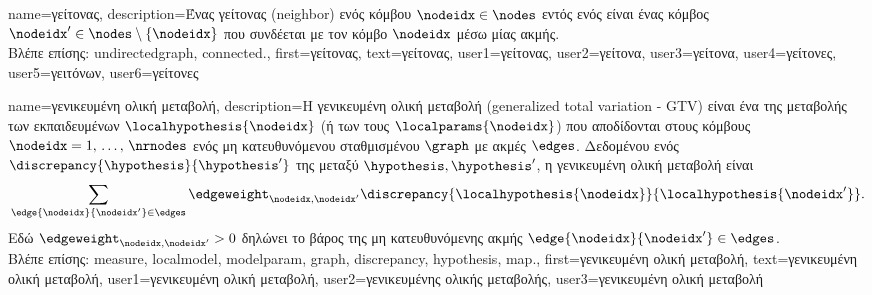 {name={\foreignlanguage{greek}{γείτονας}},
	description={\foreignlanguage{greek}{Ένας γείτονας} (neighbor) \foreignlanguage{greek}{ενός 
		κόμβου} 
		$\nodeidx \in \nodes$ \foreignlanguage{greek}{εντός ενός}  
		\foreignlanguage{greek}{είναι ένας κόμβος $\nodeidx' \in \nodes \setminus \{ \nodeidx\}$ 
		που συνδέεται με τον κόμβο $\nodeidx$ μέσω μίας ακμής}.
		\\
		\foreignlanguage{greek}{Βλέπε επίσης:} \gls{undirectedgraph}, \gls{connected}.},
	first={\foreignlanguage{greek}{γεί\-τονας}},
	text={\foreignlanguage{greek}{γεί\-τονας}},
	user1={\foreignlanguage{greek}{γείτονας}}, %
   	user2={\foreignlanguage{greek}{γείτονα}}, %
	user3={\foreignlanguage{greek}{γείτονα}}, %
	user4={\foreignlanguage{greek}{γείτονες}}, %
   	user5={\foreignlanguage{greek}{γειτόνων}}, %
	user6={\foreignlanguage{greek}{γείτονες}} %
}

{name={\foreignlanguage{greek}{γενικευμένη ολική μεταβολή}}, 
	description={\foreignlanguage{greek}{Η γενικευμένη ολική μεταβολή} (generalized total variation - GTV) \foreignlanguage{greek}{είναι 
		ένα}  \foreignlanguage{greek}{της μεταβολής των 
		εκπαιδευμένων} 
		 $\localhypothesis{\nodeidx}$ (\foreignlanguage{greek}{ή των}  
		\foreignlanguage{greek}{τους} $\localparams{\nodeidx}$) \foreignlanguage{greek}{που αποδίδονται στους κόμβους 
		$\nodeidx=1, \,\ldots, \,\nrnodes$ ενός μη κατευθυνόμενου σταθμισμένου}  $\graph$ 
		\foreignlanguage{greek}{με ακμές $\edges$. Δεδομένου ενός}  $\discrepancy{\hypothesis}{\hypothesis'}$ 
		\foreignlanguage{greek}{της}  \foreignlanguage{greek}{μεταξύ}  
		 $\hypothesis,\hypothesis'$, \foreignlanguage{greek}{η γενικευμένη ολική μεταβολή είναι}
		\begin{equation} 
			\nonumber
			\sum_{\edge{\nodeidx}{\nodeidx'}\in \edges} \edgeweight_{\nodeidx,\nodeidx'} 
			\discrepancy{\localhypothesis{\nodeidx}}{\localhypothesis{\nodeidx'}}.
		\end{equation}
		\foreignlanguage{greek}{Εδώ $\edgeweight_{\nodeidx,\nodeidx'}>0$ δηλώνει το βάρος της μη κατευθυνόμενης ακμής} 
		$\edge{\nodeidx}{\nodeidx'}\in \edges$. 
		\\
		\foreignlanguage{greek}{Βλέπε επίσης:} \gls{measure}, \gls{localmodel}, \gls{modelparam}, \gls{graph}, \gls{discrepancy}, 
		\gls{hypothesis}, \gls{map}.},
	first={\foreignlanguage{greek}{γενικευμένη ολική μεταβολή}},
	text={\foreignlanguage{greek}{γενικευμένη ολική μεταβολή}},
	user1={\foreignlanguage{greek}{γενικευμένη ολική μεταβολή}}, %
  	user2={\foreignlanguage{greek}{γενικευμένης ολικής μεταβολής}}, %
	user3={\foreignlanguage{greek}{γενικευμένη ολική μεταβολή}} %
}

